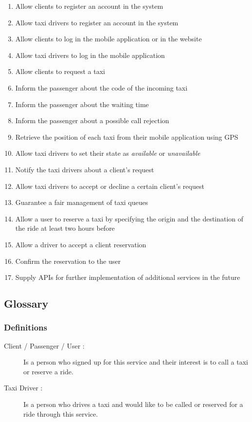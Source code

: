 \documentclass[a4paper]{article}
\begin{document}
\begin{enumerate}[label=\bfseries G\arabic*:]
\item Allow clients to register an account in the system
\item Allow taxi drivers to register an account in the system
\item Allow clients to log in the mobile application or in the website
\item Allow taxi drivers to log in the mobile application
\item Allow clients to request a taxi
\item Inform the passenger about the code of the incoming taxi
\item Inform the passenger about the waiting time
\item Inform the passenger about a possible call rejection
\item Retrieve the position of each taxi from their mobile application using GPS
\item Allow taxi drivers to set their state as \emph{available} or \emph{unavailable}
\item Notify the taxi drivers about a client's request
\item Allow taxi drivers to accept or decline a certain client's request
\item Guarantee a fair management of taxi queues
\item Allow a user to reserve a taxi by specifying the origin and the destination of the ride at least two hours before
\item Allow a driver to accept a client reservation
\item Confirm the reservation to the user
\item Supply APIs for further implementation of additional services in the future
\end{enumerate}

\subsection{Glossary}
\subsubsection{Definitions}
\begin{description}
\item[Client / Passenger / User :] Is a person who signed up for this service and their interest is to call a taxi or reserve  a ride.
\item[Taxi Driver :] Is a person who drives a taxi and would like to be called or reserved for a ride through this service.
\end{description}
\end{document}
